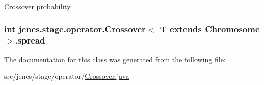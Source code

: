 Crossover probability \hypertarget{classjenes_1_1stage_1_1operator_1_1_crossover_3_01_t_01extends_01_chromosome_01_4_ac70ed1d50508b2c367559c46e1f39453}{
\subsubsection[{spread}]{\setlength{\rightskip}{0pt plus 5cm}int jenes.\-stage.\-operator.\-Crossover$<$ T extends Chromosome $>$.spread\hspace{0.3cm}{\ttfamily [private]}}}\label{classjenes_1_1stage_1_1operator_1_1_crossover_3_01_t_01extends_01_chromosome_01_4_ac70ed1d50508b2c367559c46e1f39453}


The documentation for this class was generated from the following file\-:\begin{DoxyCompactItemize}
\item 
src/jenes/stage/operator/\hyperlink{_crossover_8java}{Crossover.\-java}\end{DoxyCompactItemize}
